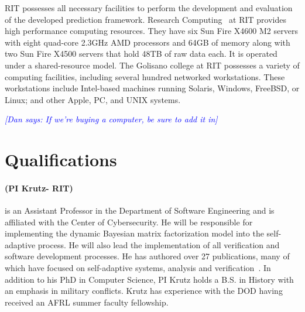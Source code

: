 \documentclass[12pt]{article}
\newcommand{\dan}[1]{\textcolor{blue}{{\it [Dan says: #1]}}}
\begin{document}
RIT possesses all necessary facilities to perform the development and evaluation of the developed prediction framework. Research Computing~\cite{RIT_ResearchComputing_URL} at RIT provides high performance computing resources. They have six Sun Fire X4600 M2 servers with eight quad-core 2.3GHz AMD processors and 64GB of memory along with two Sun Fire X4500 servers that hold 48TB of raw data each. It is operated under a shared-resource model. The Golisano college at RIT possesses a variety of computing facilities, including several hundred networked workstations. These workstations include Intel-based machines running Solaris, Windows, FreeBSD, or Linux; and other Apple, PC, and UNIX systems.





\dan{If we're buying a computer, be sure to add it in}


\section{Qualifications}

\vspace{-3mm}\paragraph{(PI Krutz- RIT)}is an Assistant Professor in the Department of Software Engineering and is affiliated with the Center of Cybersecurity. He will be responsible for implementing the dynamic Bayesian matrix factorization model into the self-adaptive process. He will also lead the implementation of all verification and software development processes. He has authored over 27 publications, many of which have focused on self-adaptive systems, analysis and verification~\cite{McAfee:2017:CCA:3104086.3104132, Understanding_Relationship_SEAD18,Chester:2017:MLD:3104086.3104135, Dennis:2017:PPS:3104086.3104136,krutz2015examining, krutz2013cccd, krutzThesis}. In addition to his PhD in Computer Science, PI Krutz holds a B.S. in History with an emphasis in military conflicts. Krutz has experience with the DOD having received an AFRL summer faculty fellowship.%
\end{document}
